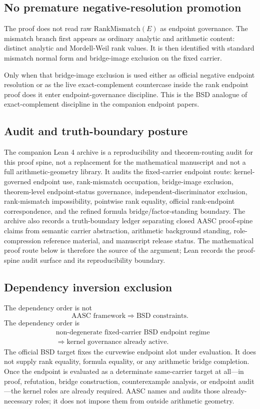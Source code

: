 \documentclass[11pt]{article}
\newcommand{\RankMismatch}{\mathrm{RankMismatch}}
\begin{document}
\subsection*{No premature negative-resolution promotion}
The proof does not read raw $\RankMismatch(E)$ as endpoint governance. The mismatch branch first appears as ordinary analytic and arithmetic content: distinct analytic and Mordell-Weil rank values. It is then identified with standard mismatch normal form and bridge-image exclusion on the fixed carrier.

Only when that bridge-image exclusion is used either as official negative endpoint resolution or as the live exact-complement countercase inside the rank endpoint proof does it enter endpoint-governance discipline. This is the BSD analogue of exact-complement discipline in the companion endpoint papers.

\subsection*{Audit and truth-boundary posture}
The companion Lean 4 archive is a reproducibility and theorem-routing audit for this proof spine, not a replacement for the mathematical manuscript and not a full arithmetic-geometry library. It audits the fixed-carrier endpoint route: kernel-governed endpoint use, rank-mismatch occupation, bridge-image exclusion, theorem-level endpoint-status governance, independent-discriminator exclusion, rank-mismatch impossibility, pointwise rank equality, official rank-endpoint correspondence, and the refined formula bridge/factor-standing boundary. The archive also records a truth-boundary ledger separating closed AASC proof-spine claims from semantic carrier abstraction, arithmetic background standing, role-compression reference material, and manuscript release status. The mathematical proof route below is therefore the source of the argument; Lean records the proof-spine audit surface and its reproducibility boundary.

\subsection*{Dependency inversion exclusion}
The dependency order is not
\[
\text{AASC framework} \Rightarrow \text{BSD constraints}.
\]
The dependency order is
\[
\begin{aligned}
&\text{non-degenerate fixed-carrier BSD endpoint regime}\\
&\Rightarrow \text{kernel governance already active}.
\end{aligned}
\]
The official BSD target fixes the curvewise endpoint slot under evaluation. It does not supply rank equality, formula equality, or any arithmetic bridge completion. Once the endpoint is evaluated as a determinate same-carrier target at all---in proof, refutation, bridge construction, counterexample analysis, or endpoint audit---the kernel roles are already required. AASC names and audits those already-necessary roles; it does not impose them from outside arithmetic geometry.
\end{document}
